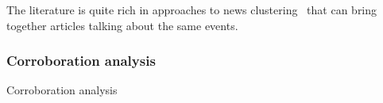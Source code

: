 





The literature is quite rich in approaches to news clustering~\cite{carpineto2009survey,jones1972statistical} %
that can bring together articles talking about the same events.










\subsubsection{Corroboration analysis}
Corroboration analysis

